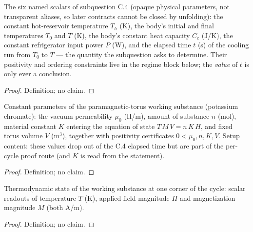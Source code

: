 \begin{definition}
\label{def:IPhO2026Problems_problem_IPhO_2026_3_C_4:globalQuantities}
The six named scalars of subquestion C.4 (opaque physical parameters,
not transparent aliases, so later contracts cannot be closed by
unfolding): the constant hot-reservoir temperature $T_h$ (K), the
body's initial and final temperatures $T_0$ and $T$ (K), the body's
constant heat capacity $C_c$ (J/K), the constant refrigerator input
power $P$ (W), and the elapsed time $t$ (s) of the cooling run from
$T_0$ to $T$ --- the quantity the subquestion asks to determine.
Their positivity and ordering constraints live in the regime block
below; the \emph{value} of $t$ is only ever a conclusion.
\end{definition}
\begin{proof}
Definition; no claim.
\end{proof}

\begin{definition}
\label{def:IPhO2026Problems_problem_IPhO_2026_3_C_4:TorusParams}
Constant parameters of the paramagnetic-torus working substance
(potassium chromate): the vacuum permeability $\mu_0$ (H/m), amount of
substance $n$ (mol), material constant $K$ entering the equation of
state $T\,M\,V = n\,K\,H$, and fixed torus volume $V$ (m$^3$), together
with positivity certificates $0 < \mu_0, n, K, V$. Setup content:
these values drop out of the C.4 elapsed time but are part of the
per-cycle proof route (and $K$ is read from the statement).
\end{definition}
\begin{proof}
Definition; no claim.
\end{proof}

\begin{definition}
\label{def:IPhO2026Problems_problem_IPhO_2026_3_C_4:WorkingState}
Thermodynamic state of the working substance at one corner of the
cycle: scalar readouts of temperature $T$ (K), applied-field magnitude
$H$ and magnetization magnitude $M$ (both A/m).
\end{definition}
\begin{proof}
Definition; no claim.
\end{proof}

